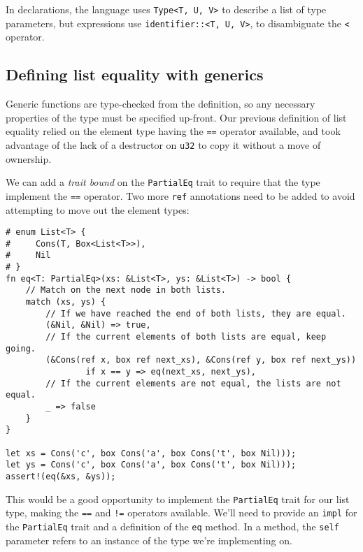 \documentclass[]{article}
\begin{document}
In declarations, the language uses
\texttt{Type\textless{}T, U, V\textgreater{}} to describe a list of type
parameters, but expressions use
\texttt{identifier::\textless{}T, U, V\textgreater{}}, to disambiguate
the \texttt{\textless{}} operator.

\subsection{Defining list equality with
generics}\label{defining-list-equality-with-generics}

Generic functions are type-checked from the definition, so any necessary
properties of the type must be specified up-front. Our previous
definition of list equality relied on the element type having the
\texttt{==} operator available, and took advantage of the lack of a
destructor on \texttt{u32} to copy it without a move of ownership.

We can add a \emph{trait bound} on the \texttt{PartialEq} trait to
require that the type implement the \texttt{==} operator. Two more
\texttt{ref} annotations need to be added to avoid attempting to move
out the element types:

\begin{verbatim}
# enum List<T> {
#     Cons(T, Box<List<T>>),
#     Nil
# }
fn eq<T: PartialEq>(xs: &List<T>, ys: &List<T>) -> bool {
    // Match on the next node in both lists.
    match (xs, ys) {
        // If we have reached the end of both lists, they are equal.
        (&Nil, &Nil) => true,
        // If the current elements of both lists are equal, keep going.
        (&Cons(ref x, box ref next_xs), &Cons(ref y, box ref next_ys))
                if x == y => eq(next_xs, next_ys),
        // If the current elements are not equal, the lists are not equal.
        _ => false
    }
}

let xs = Cons('c', box Cons('a', box Cons('t', box Nil)));
let ys = Cons('c', box Cons('a', box Cons('t', box Nil)));
assert!(eq(&xs, &ys));
\end{verbatim}

This would be a good opportunity to implement the \texttt{PartialEq}
trait for our list type, making the \texttt{==} and \texttt{!=}
operators available. We'll need to provide an \texttt{impl} for the
\texttt{PartialEq} trait and a definition of the \texttt{eq} method. In
a method, the \texttt{self} parameter refers to an instance of the type
we're implementing on.
\end{document}
